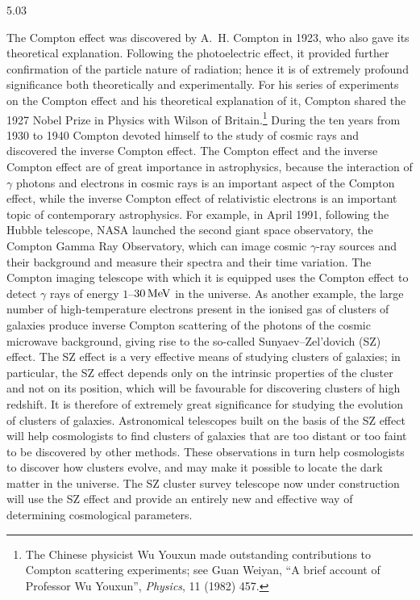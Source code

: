 \begin{solution}{5.03}
\begin{commentary}
The Compton effect was discovered by A.~H. Compton in 1923, who also gave its theoretical
explanation. Following the photoelectric effect, it provided further confirmation of the
particle nature of radiation; hence it is of extremely profound significance both
theoretically and experimentally. For his series of experiments on the Compton effect and his
theoretical explanation of it, Compton shared the 1927 Nobel Prize in Physics with Wilson of
Britain.\footnote{The Chinese physicist Wu Youxun made outstanding contributions to Compton
scattering experiments; see Guan Weiyan, ``A brief account of Professor Wu Youxun'',
\emph{Physics}, 11 (1982) 457.} During the ten years from 1930 to 1940 Compton devoted himself
to the study of cosmic rays and discovered the inverse Compton effect. The Compton effect and
the inverse Compton effect are of great importance in astrophysics, because the interaction
of $\gamma$ photons and electrons in cosmic rays is an important aspect of the Compton effect,
while the inverse Compton effect of relativistic electrons is an important topic of
contemporary astrophysics. For example, in April 1991, following the Hubble telescope, NASA
launched the second giant space observatory, the Compton Gamma Ray Observatory, which can
image cosmic $\gamma$-ray sources and their background and measure their spectra and their
time variation. The Compton imaging telescope with which it is equipped uses the Compton
effect to detect $\gamma$ rays of energy $1$--$30\,\mathrm{MeV}$ in the universe. As another
example, the large number of high-temperature electrons present in the ionised gas of clusters
of galaxies produce inverse Compton scattering of the photons of the cosmic microwave
background, giving rise to the so-called Sunyaev--Zel'dovich (SZ) effect. The SZ effect is a
very effective means of studying clusters of galaxies; in particular, the SZ effect depends
only on the intrinsic properties of the cluster and not on its position, which will be
favourable for discovering clusters of high redshift. It is therefore of extremely great
significance for studying the evolution of clusters of galaxies. Astronomical telescopes
built on the basis of the SZ effect will help cosmologists to find clusters of galaxies that
are too distant or too faint to be discovered by other methods. These observations in turn
help cosmologists to discover how clusters evolve, and may make it possible to locate the
dark matter in the universe. The SZ cluster survey telescope now under construction will use
the SZ effect and provide an entirely new and effective way of determining cosmological
parameters.
\end{commentary}
\end{solution}

